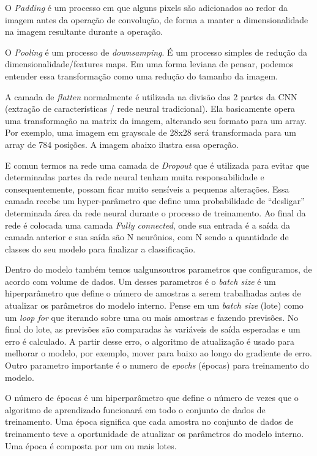 \documentclass[openright]{UFRGS} %
\begin{document}
O \textit{Padding} é um processo em que alguns pixels são adicionados ao redor da imagem antes da operação de convolução, de forma a manter a dimensionalidade na imagem resultante durante a operação.


O \textit{Pooling} é um processo de \textit{downsamping}. É um processo simples de redução da dimensionalidade/features maps. Em uma forma leviana de pensar, podemos entender essa transformação como uma redução do tamanho da imagem.


A camada de  \textit{flatten} normalmente é utilizada na divisão das 2 partes da CNN (extração de características / rede neural tradicional). Ela basicamente opera uma transformação na matrix da imagem, alterando seu formato para um array. Por exemplo, uma imagem em grayscale de 28x28 será transformada para um array de 784 posições. A imagem abaixo ilustra essa operação.

E comun termos na rede uma camada de \textit{Dropout} que é utilizada para evitar que determinadas partes da rede neural tenham muita responsabilidade e consequentemente, possam ficar muito sensíveis a pequenas alterações. Essa camada recebe um hyper-parâmetro que define uma probabilidade de “desligar” determinada área da rede neural durante o processo de treinamento. Ao final da rede é colocada uma camada \textit{Fully connected}, onde sua entrada é a saída da camada anterior e sua saída são N neurônios, com N sendo a quantidade de classes do seu modelo para finalizar a classificação.

Dentro do modelo também temos ualgunsoutros parametros que configuramos, de acordo com volume de dados. Um desses parametros é o \textit{batch size} é um hiperparâmetro que define o número de amostras a serem trabalhadas antes de atualizar os parâmetros do modelo interno. Pense em um \textit{batch size} (lote) como um \textit{loop for} que iterando sobre uma ou mais amostras e fazendo previsões. No final do lote, as previsões são comparadas às variáveis de saída esperadas e um erro é calculado. A partir desse erro, o algoritmo de atualização é usado para melhorar o modelo, por exemplo, mover para baixo ao longo do gradiente de erro. Outro parametro importante  é o numero de \textit{epochs} (épocas) para treinamento do modelo.



O número de épocas é um hiperparâmetro que define o número de vezes que o algoritmo de aprendizado funcionará em todo o conjunto de dados de treinamento. Uma época significa que cada amostra no conjunto de dados de treinamento teve a oportunidade de atualizar os parâmetros do modelo interno. Uma época é composta por um ou mais lotes.
\end{document}
